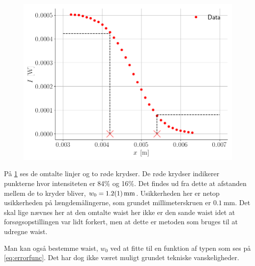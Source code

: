 \documentclass[main]{subfiles}
\begin{document}
\begin{figure}[H]
  \centering
  \includegraphics[width=\linewidth]{tegninger/graf_find_w.png}
  \caption{}
  \label{fig:graf_find_w}
\end{figure}
På \cref{fig:graf_find_w} ses de omtalte linjer og to røde krydser. De røde krydser indikerer punkterne hvor intensiteten er 84\% og 16\%. Det findes ud fra dette at afstanden mellem de to kryder bliver, $w_0 =\SI{1,2 \pm 0,1}{\milli\meter} $. Usikkerheden her er netop usikkerheden på længdemålingerne, som grundet millimeterskruen er $\SI{0,1}{\milli\meter}$. Det skal lige nævnes her at den omtalte waist her ikke er den sande waist idet at forsøgsopstillingen var lidt forkert, men at dette er metoden som bruges til at udregne waist.

Man kan også bestemme waist, $w_0$ ved at fitte til en funktion af typen som ses på \cref{eq:errorfunc}. Det har dog ikke været muligt grundet tekniske vanskeligheder.
\end{document}

